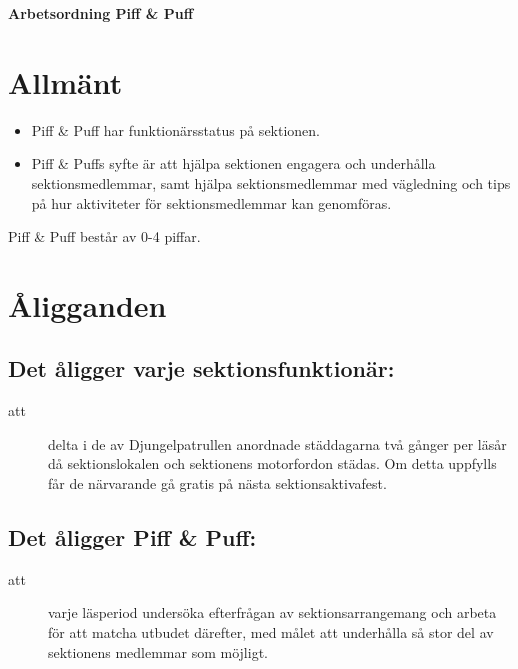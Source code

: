 \renewcommand{\dateseparator}{-} %

\renewcommand{\forening}{Piff \& Puff }

\begin{center}
\LARGE{\textbf{Arbetsordning \forening}}
\end{center}




\section{Allmänt}
\begin{itemize}
\item \forening har funktionärsstatus på sektionen. 
\item Piff \& Puffs syfte är att hjälpa sektionen engagera och underhålla sektionsmedlemmar, samt hjälpa sektionsmedlemmar med vägledning och tips på hur aktiviteter för sektionsmedlemmar kan genomföras.
\end{itemize}


\forening består av 0-4 piffar. 


\section{Åligganden}
\subsection{Det åligger varje sektionsfunktionär:}
    \begin{description}
      \item[att] delta i de av Djungelpatrullen anordnade städdagarna två gånger per
      läsår då sektionslokalen och sektionens motorfordon städas. Om detta uppfylls får de närvarande gå gratis på nästa
      sektionsaktivafest.
    \end{description}
\subsection{Det åligger Piff \& Puff:}
	\begin{description}
        \item[att] varje läsperiod undersöka efterfrågan av sektionsarrangemang och arbeta för att matcha utbudet därefter, med målet att underhålla så stor del av sektionens medlemmar som möjligt.
  	\end{description}


